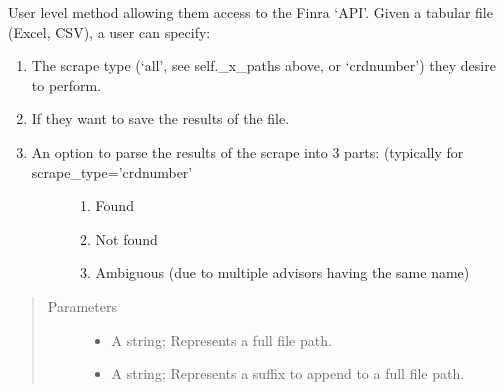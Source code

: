 \documentclass[letterpaper,10pt,english]{sphinxmanual}
\begin{document}
\begin{fulllineitems}
\begin{fulllineitems}
\label{\detokenize{index:ListManagement.search.finra.Finra.scrape}}
User level method allowing them access to the Finra ‘API’. Given a tabular file (Excel, CSV),
a user can specify:
\begin{enumerate}
\def\theenumi{\arabic{enumi}}
\def\labelenumi{\theenumi )}
\makeatletter\def\p@enumii{\p@enumi \theenumi )}\makeatother
\item {} 
The scrape type (‘all’, see self.\_x\_paths above, or ‘crdnumber’) they desire to perform.

\item {} 
If they want to save the results of the file.

\item {} \begin{description}
\item[{An option to parse the results of the scrape into 3 parts: (typically for scrape\_type=’crdnumber’}] \leavevmode\begin{enumerate}
\def\theenumii{\alph{enumii}}
\def\labelenumii{\theenumii )}
\makeatletter\def\p@enumiii{\p@enumii \theenumii )}\makeatother
\item {} 
Found

\item {} 
Not found

\item {} 
Ambiguous (due to multiple advisors having the same name)

\end{enumerate}

\end{description}

\end{enumerate}
\begin{quote}\begin{description}
\item[{Parameters}] \leavevmode\begin{itemize}
\item {} 
 \textendash{} A string; Represents a full file path.

\item {} 
 \textendash{} A string; Represents a suffix to append to a full file path.


\end{itemize}
\end{description}
\end{quote}
\end{fulllineitems}
\end{fulllineitems}
\end{document}
